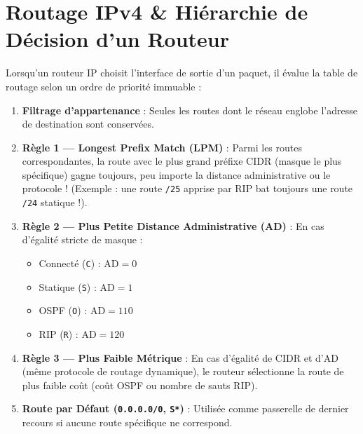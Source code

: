 \documentclass[11pt,a4paper]{report}
\begin{document}
\section{Routage IPv4 \& Hi\'erarchie de D\'ecision d'un Routeur}
Lorsqu'un routeur IP choisit l'interface de sortie d'un paquet, il \'evalue la table de routage selon un ordre de priorit\'e immuable :
\begin{enumerate}
    \item \textbf{Filtrage d'appartenance} : Seules les routes dont le r\'eseau englobe l'adresse de destination sont conserv\'ees.
    \item \textbf{R\`egle 1 --- Longest Prefix Match (LPM)} : Parmi les routes correspondantes, la route avec le plus grand pr\'efixe CIDR (masque le plus sp\'ecifique) gagne toujours, peu importe la distance administrative ou le protocole ! (Exemple : une route \texttt{/25} apprise par RIP bat toujours une route \texttt{/24} statique !).
    \item \textbf{R\`egle 2 --- Plus Petite Distance Administrative (AD)} : En cas d'\'egalit\'e stricte de masque :
    \begin{itemize}
        \item Connect\'e (\texttt{C}) : $\text{AD} = 0$
        \item Statique (\texttt{S}) : $\text{AD} = 1$
        \item OSPF (\texttt{O}) : $\text{AD} = 110$
        \item RIP (\texttt{R}) : $\text{AD} = 120$
    \end{itemize}
    \item \textbf{R\`egle 3 --- Plus Faible M\'etrique} : En cas d'\'egalit\'e de CIDR et d'AD (m\^eme protocole de routage dynamique), le routeur s\'electionne la route de plus faible co\^ut (co\^ut OSPF ou nombre de sauts RIP).
    \item \textbf{Route par D\'efaut (\texttt{0.0.0.0/0}, \texttt{S*})} : Utilis\'ee comme passerelle de dernier recours si aucune route sp\'ecifique ne correspond.
\end{enumerate}
\end{document}
